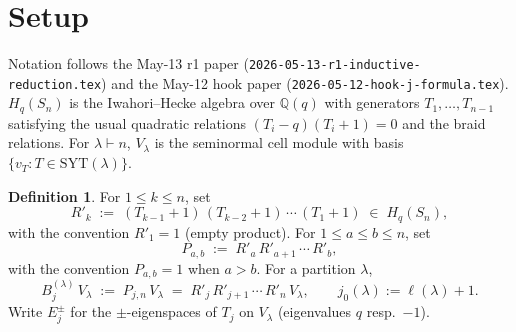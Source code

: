\documentclass[11pt]{article}
\theoremstyle{definition}
\newtheorem{definition}[theorem]{Definition}
\begin{document}
\begin{abstract}
\textbf{Consequences.}  Beyond the hook $j$-formula itself:
\begin{enumerate}[leftmargin=2em,topsep=0.2em,itemsep=0.1em]
\item The May-12 evening-3 paper's $\dim B = 3$ for
$\lambda = (4, 2, 1^{n-6})$ becomes \emph{unconditional} (the upper bound
relied on the hook $j$-formula at $k = 4$, which was conditional then;
this paper closes that gap).
\item The same-row-dies conjecture for $\lambda = (k, k, 1^q)$ reduces
to the $j$-formula for the sub-shape $\nu = (k, k-2, 1^q)$ via the same
Shift Lemma machinery (concrete next target on this thread).
\item The framework is shape-agnostic: any same-row-dies argument can
be carried out via Shift Lemma plus a $j$-formula on the sub-shape.
\end{enumerate}

The mathematical content is short and self-contained; the heaviest input
is the May-11/May-12 hook base cases and the Phase~A endpoint (May-19).
\end{abstract}

\section{Setup}\label{sec:setup}

Notation follows the May-13 r1 paper
(\texttt{2026-05-13-r1-inductive-reduction.tex}) and the May-12 hook
paper (\texttt{2026-05-12-hook-j-formula.tex}).
$H_q(S_n)$ is the Iwahori--Hecke algebra over $\mathbb{Q}(q)$ with
generators $T_1, \ldots, T_{n-1}$ satisfying the usual quadratic
relations $(T_i - q)(T_i + 1) = 0$ and the braid relations.
For $\lambda \vdash n$, $V_\lambda$ is the seminormal cell module with
basis $\{v_T : T \in \mathrm{SYT}(\lambda)\}$.

\begin{definition}\label{def:notation}
For $1 \le k \le n$, set
\[
   R'_k \;:=\; (T_{k-1}{+}1)\,(T_{k-2}{+}1)\,\cdots\,(T_1{+}1)
   \;\in\; H_q(S_n),
\]
with the convention $R'_1 = 1$ (empty product).  For $1 \le a \le b \le n$,
set
\[
   P_{a, b} \;:=\; R'_a\,R'_{a+1}\,\cdots\,R'_b,
\]
with the convention $P_{a, b} = 1$ when $a > b$.
For a partition $\lambda$,
\[
   B^{(\lambda)}_j\,V_\lambda \;:=\; P_{j, n}\,V_\lambda
   \;=\; R'_j\,R'_{j+1}\,\cdots\,R'_n\,V_\lambda,
   \qquad
   j_0(\lambda) := \ell(\lambda) + 1.
\]
Write $E_j^\pm$ for the $\pm$-eigenspaces of $T_j$ on $V_\lambda$
(eigenvalues $q$ resp.\ $-1$).
\end{definition}
\end{document}
